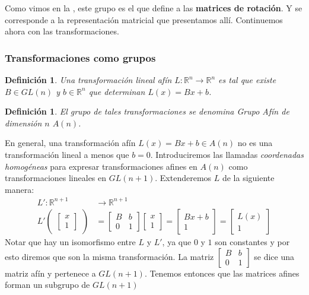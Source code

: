 \documentclass[ twoside,openright,titlepage,numbers=noenddot,%
                headinclude,footinclude,cleardoublepage=empty,abstract=on,
                BCOR=-5mm,paper=a4,fontsize=11pt
                ]{scrreprt}
\newtheorem{definition}[theorem]{Definición}
\newcommand{\R}{\mathbb{R}}
\begin{document}
Como vimos en la , este grupo es el que
define a las \textbf{matrices de rotación}. Y se corresponde a la
representación matricial que presentamos allí. Continuemos ahora con las
transformaciones.

\hypertarget{transformaciones-como-grupos}{%
\subsubsection{Transformaciones como
grupos}\label{transformaciones-como-grupos}}

\begin{definition}Una transformación lineal afín
\(L : \R^n \rightarrow \R^n\) es tal que existe \(B \in GL(n)\) y
\(b \in \R^n\) que determinan \(L(x) = Bx + b\).\end{definition}

\begin{definition}El grupo de tales transformaciones se denomina Grupo
Afín de dimensión \(n\) \(A(n)\).\end{definition}

En general, una transformación afín \(L(x) = Bx + b \in A(n)\) no es una
transformación lineal a menos que \(b = 0\). Introduciremos las llamadas
\emph{coordenadas homogéneas} para expresar transformaciones afines en
\(A(n)\) como transformaciones lineales en \(GL(n + 1)\). Extenderemos
\(L\) de la siguiente manera: \begin{align}
L': \R^{n+1} &\rightarrow \R^{n+1} \\
L' \begin{pmatrix}\begin{bmatrix}x \\ 1\end{bmatrix}\end{pmatrix} &= \begin{bmatrix}
B & b \\
0 & 1
\end{bmatrix}
\begin{bmatrix}x \\ 1\end{bmatrix}
= \begin{bmatrix} Bx + b \\ 1 \end{bmatrix}
= \begin{bmatrix} L(x) \\ 1 \end{bmatrix}
\end{align} Notar que hay un isomorfismo entre \(L\) y \(L'\), ya que
\(0\) y \(1\) son constantes y por esto diremos que son la misma
transformación. La matriz
\(\begin{bmatrix} B & b \\ 0 & 1 \end{bmatrix}\) se dice una matriz afín
y pertenece a \(GL(n + 1)\). Tenemos entonces que las matrices afines
forman un subgrupo de \(GL(n + 1)\)
\end{document}
